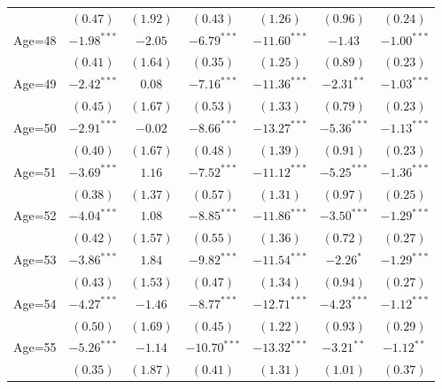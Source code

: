 \documentclass[fullpage]{paper}
\begin{document}
\begin{center}
\begin{longtable}{l c c c c c c }
            & $(0.47)$      & $(1.92)$      & $(0.43)$       & $(1.26)$       & $(0.96)$      & $(0.24)$      \\
Age=48      & $-1.98^{***}$ & $-2.05$       & $-6.79^{***}$  & $-11.60^{***}$ & $-1.43$       & $-1.00^{***}$ \\
            & $(0.41)$      & $(1.64)$      & $(0.35)$       & $(1.25)$       & $(0.89)$      & $(0.23)$      \\
Age=49      & $-2.42^{***}$ & $0.08$        & $-7.16^{***}$  & $-11.36^{***}$ & $-2.31^{**}$  & $-1.03^{***}$ \\
            & $(0.45)$      & $(1.67)$      & $(0.53)$       & $(1.33)$       & $(0.79)$      & $(0.23)$      \\
Age=50      & $-2.91^{***}$ & $-0.02$       & $-8.66^{***}$  & $-13.27^{***}$ & $-5.36^{***}$ & $-1.13^{***}$ \\
            & $(0.40)$      & $(1.67)$      & $(0.48)$       & $(1.39)$       & $(0.91)$      & $(0.23)$      \\
Age=51      & $-3.69^{***}$ & $1.16$        & $-7.52^{***}$  & $-11.12^{***}$ & $-5.25^{***}$ & $-1.36^{***}$ \\
            & $(0.38)$      & $(1.37)$      & $(0.57)$       & $(1.31)$       & $(0.97)$      & $(0.25)$      \\
Age=52      & $-4.04^{***}$ & $1.08$        & $-8.85^{***}$  & $-11.86^{***}$ & $-3.50^{***}$ & $-1.29^{***}$ \\
            & $(0.42)$      & $(1.57)$      & $(0.55)$       & $(1.36)$       & $(0.72)$      & $(0.27)$      \\
Age=53      & $-3.86^{***}$ & $1.84$        & $-9.82^{***}$  & $-11.54^{***}$ & $-2.26^{*}$   & $-1.29^{***}$ \\
            & $(0.43)$      & $(1.53)$      & $(0.47)$       & $(1.34)$       & $(0.94)$      & $(0.27)$      \\
Age=54      & $-4.27^{***}$ & $-1.46$       & $-8.77^{***}$  & $-12.71^{***}$ & $-4.23^{***}$ & $-1.12^{***}$ \\
            & $(0.50)$      & $(1.69)$      & $(0.45)$       & $(1.22)$       & $(0.93)$      & $(0.29)$      \\
Age=55      & $-5.26^{***}$ & $-1.14$       & $-10.70^{***}$ & $-13.32^{***}$ & $-3.21^{**}$  & $-1.12^{**}$  \\
            & $(0.35)$      & $(1.87)$      & $(0.41)$       & $(1.31)$       & $(1.01)$      & $(0.37)$      \\

\end{longtable}
\end{center}
\end{document}
